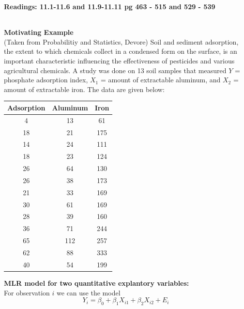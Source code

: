 \begin{center}\large\textbf{Readings: 11.1-11.6 and 11.9-11.11 pg 463 - 515 and 529 - 539}\\
\normalsize \end{center}
\large \hlinewd{2pt}
~\\

\textbf{Motivating Example}\\
(Taken from Probabilitiy and Statistics, Devore)  Soil and sediment adsorption, the extent to which chemicals collect in a condensed form on the surface, is an important characteristic influencing the effectiveness of pesticides and various agricultural chemicals.  A study was done on 13 soil samples that measured $Y$ = phosphate adsorption index, $X_1$ = amount of extractable aluminum, and $X_2$ = amount of extractable iron.  The data are given below:
\begin{center}
\begin{tabular}{ccc}
Adsorption & Aluminum & Iron\\
\hline
4 &13& 61\\
18&21&175\\
14&24&111\\
18&23&124\\
26&64&130\\
26&38&173\\
21&33&169\\
30&61&169\\
28&39&160\\
36&71&244\\
65&112&257\\
62&88&333\\
40&54&199\\
\end{tabular}
\end{center}

\textbf{MLR model for two quantitative explantory variables:}\\
For observation $i$ we can use the model
$$Y_i = \beta_0 + \beta_1 X_{i1} + \beta_2 X_{i2} + E_{i}$$

\newpage

